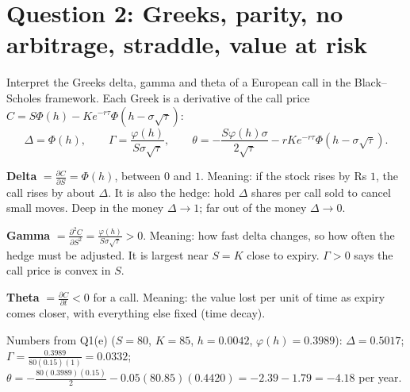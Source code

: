 \section{Question 2: Greeks, parity, no arbitrage, straddle, value at risk}

\begin{problem}[Q2(a)]
Interpret the Greeks delta, gamma and theta of a European call in the Black--Scholes framework.
\cardsays Each Greek is a derivative of the call price $C=S\Phi(h)-Ke^{-r\tau}\Phi(h-\sigma\sqrt\tau)$:
\[
\Delta=\Phi(h),\qquad\Gamma=\frac{\varphi(h)}{S\sigma\sqrt\tau},\qquad\theta=-\frac{S\varphi(h)\sigma}{2\sqrt\tau}-rKe^{-r\tau}\Phi(h-\sigma\sqrt\tau).
\]
\working
\begin{steps}
\item \textbf{Delta} $=\frac{\partial C}{\partial S}=\Phi(h)$, between $0$ and $1$. Meaning: if the stock rises by Rs $1$, the call rises by about $\Delta$. It is also the hedge: hold $\Delta$ shares per call sold to cancel small moves. Deep in the money $\Delta\to1$; far out of the money $\Delta\to0$.
\item \textbf{Gamma} $=\frac{\partial^2C}{\partial S^2}=\frac{\varphi(h)}{S\sigma\sqrt\tau}>0$. Meaning: how fast delta changes, so how often the hedge must be adjusted. It is largest near $S=K$ close to expiry. $\Gamma>0$ says the call price is convex in $S$.
\item \textbf{Theta} $=\frac{\partial C}{\partial t}<0$ for a call. Meaning: the value lost per unit of time as expiry comes closer, with everything else fixed (time decay).
\item Numbers from Q1(e) ($S=80$, $K=85$, $h=0.0042$, $\varphi(h)=0.3989$): $\Delta=0.5017$; $\Gamma=\frac{0.3989}{80(0.15)(1)}=0.0332$; $\theta=-\frac{80(0.3989)(0.15)}{2}-0.05(80.85)(0.4420)=-2.39-1.79=-4.18$ per year.
\end{steps}
\end{problem}

